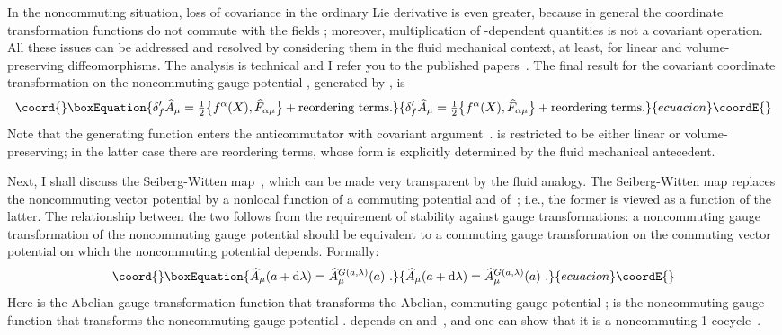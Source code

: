 \documentclass[a4paper,12pt,twoside]{article}
\providecommand{\rd}[1]{\mathop{\mathrm{d}#1}}
\providecommand{\fract}[2]{{\textstyle\frac{#1}{#2}}}
\providecommand{\numeq}[2]{\begin{equation}\coord{}\boxEquation{
#2
\label{#1}
}{
#2
}{ecuacion}\coordE{}\end{equation}}
\let\hat\widehat
\begin{document}
In the noncommuting situation, loss of covariance in the ordinary Lie derivative is even
greater, because in general the coordinate transformation functions \coordHE{} do not
commute with the fields \coordHE{}; moreover, multiplication of \coordHE{}-dependent
quantities is not a covariant operation. All these issues can be addressed and resolved by
considering them in the fluid mechanical context, at least, for linear and volume-preserving
diffeomorphisms. The analysis is technical and I refer you to the published papers~\cite{r3,r6}.
The final result for the covariant coordinate transformation on the noncommuting gauge
potential \myHighlight{$\hat A_\mu$}\coordHE{}, generated by \coordHE{}, is 
\numeq{en25}{
\delta'_f \hat A_\mu = \fract12 \bigl\{
f^\alpha(X), \hat F_{\alpha\mu}\bigr\} + \mbox{reordering terms.}
}
Note that the generating function \coordHE{} enters the anticommutator with covariant
argument~\coordHE{}. \coordHE{} is restricted to be either linear or volume-preserving; in the latter
case there are reordering terms, whose form is explicitly determined by the fluid mechanical
antecedent.

Next, I shall discuss the Seiberg-Witten map~\cite{r7}, which can be made very
transparent by the fluid analogy.  The Seiberg-Witten map replaces the noncommuting vector
potential \myHighlight{$\hat A_\mu$}\coordHE{}  by a nonlocal function of a commuting potential \coordHE{} and
of~\myHighlight{$\theta$}\coordHE{};  i.e., the former is viewed as a function of the latter.  The relationship between the
two follows from the requirement of stability against gauge transformations: a noncommuting
gauge transformation  of the noncommuting gauge potential should be equivalent to a
commuting gauge transformation on the commuting vector potential on which the
noncommuting potential depends. Formally:
\numeq{en26}{
\hat A_\mu(a + \rd \lambda) = \hat A_\mu^{G(a,\lambda)} (a)\ .
}
Here \myHighlight{$\lambda$}\coordHE{} is the Abelian gauge transformation function that transforms the Abelian,
commuting gauge potential \coordHE{}; \coordHE{} is the noncommuting gauge function that
transforms the noncommuting gauge potential \myHighlight{$\hat A_\mu$}\coordHE{}. \coordHE{} depends on \coordHE{}
and~\myHighlight{$\lambda$}\coordHE{}, and one can show that it is a noncommuting 1-cocycle~\cite{r8n}.
\end{document}
